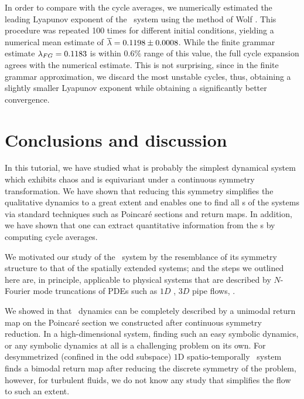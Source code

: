 \documentclass[aip,cha,
reprint,
secnumarabic,
nofootinbib, tightenlines,
nobibnotes, showkeys, showpacs,
superscriptaddress,
]{revtex4-1}
\begin{document}
{In order to compare with the cycle averages, we numerically estimated the
leading Lyapunov exponent of the \twomode\ system using the method of
Wolf \etal{}. This procedure was repeated 100 times for
different initial conditions, yielding a numerical mean estimate of
$\overline{\lambda} = 0.1198 \pm 0.0008$. While the finite grammar
estimate $\lambda_{FG} = 0.1183$ is within $0.6\%$ range of this value,
the full cycle expansion agrees with the numerical estimate. This is not
surprising, since in the finite grammar approximation, we discard the
most unstable cycles, thus, obtaining a slightly smaller Lyapunov
exponent while obtaining a significantly better convergence.

\section{Conclusions and discussion}
\label{s:concl}

In this tutorial, we have studied what is probably the simplest dynamical 
system which exhibits chaos and is equivariant under a continuous symmetry 
transformation. We have shown that reducing this symmetry simplifies the 
qualitative dynamics to a great extent and enables one to find all \rpo s of 
the systems via standard techniques such as Poincar\'e sections and return 
maps. In addition, we have shown that one can extract quantitative information
from the \rpo s by computing cycle averages.

We motivated our study of the \twomode\ system by the resemblance of its
symmetry structure to that of the spatially extended systems; and the
steps we outlined here are, in principle, applicable to physical systems
that are described by $N$-Fourier mode truncations of PDEs such as $1D$
\KS{}, $3D$ pipe flows, \etc.

We showed in  that \twomode\ dynamics can be completely
described by a unimodal return map on the Poincar\'e section we constructed
after continuous symmetry reduction. In a high-dimensional system, finding 
such an easy symbolic dynamics, or any symbolic dynamics at all is a 
challenging problem on its own. For desymmetrized (confined in the odd 
subspace) $1$D spatio-temporally \KS\ system  finds a 
bimodal return map after reducing the discrete symmetry of the problem, 
however, for turbulent fluids, we do not know any study that simplifies the 
flow to such an extent.

}
\end{document}
